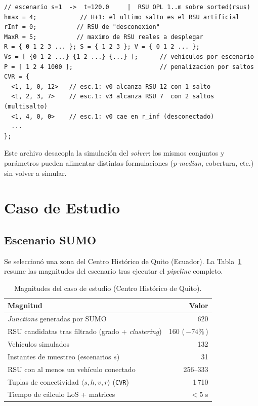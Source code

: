 \documentclass[smartcities,article,submit,oneauthor]{Definitions/mdpi}
\begin{document}
\begin{lstlisting}[language=opldat,caption={Extracto del conjunto de datos exportado
(\texttt{rsu\_backend.dat}) en sintaxis OPL, con cabecera de trazabilidad
escenario$\to t$ y RSU$\to$id de \emph{backend}.},label={lst:dat}]
// escenario s=1  ->  t=120.0     |  RSU OPL 1..m sobre sorted(rsus)
hmax = 4;            // H+1: el ultimo salto es el RSU artificial
rInf = 0;           // RSU de "desconexion"
MaxR = 5;           // maximo de RSU reales a desplegar
R = { 0 1 2 3 ... }; S = { 1 2 3 }; V = { 0 1 2 ... };
Vs = [ {0 1 2 ...} {1 2 ...} {...} ];      // vehiculos por escenario
P = [ 1 2 4 1000 ];                        // penalizacion por saltos
CVR = {
  <1, 1, 0, 12>   // esc.1: v0 alcanza RSU 12 con 1 salto
  <1, 2, 3, 7>    // esc.1: v3 alcanza RSU 7  con 2 saltos (multisalto)
  <1, 4, 0, 0>    // esc.1: v0 cae en r_inf (desconectado)
  ...
};
\end{lstlisting}

Este archivo desacopla la simulación del \emph{solver}: los mismos conjuntos y
parámetros pueden alimentar distintas formulaciones (\emph{p-median}, cobertura,
etc.) sin volver a simular.

\section{Caso de Estudio}\label{sec:caso}

\subsection{Escenario SUMO}
Se seleccionó una zona del Centro Histórico de Quito (Ecuador). La
Tabla~\ref{tab:caso} resume las magnitudes del escenario tras ejecutar el
\emph{pipeline} completo.

\begin{table}[H]
\caption{Magnitudes del caso de estudio (Centro Histórico de Quito).\label{tab:caso}}
\begin{tabularx}{\textwidth}{Xr}
\toprule
\textbf{Magnitud} & \textbf{Valor}\\
\midrule
\emph{Junctions} generadas por SUMO & 620\\
RSU candidatas tras filtrado (grado + \emph{clustering}) & 160 (\,$-74\%$\,)\\
Vehículos simulados & 132\\
Instantes de muestreo (escenarios $s$) & 31\\
RSU con al menos un vehículo conectado & 256--333\\
Tuplas de conectividad $\langle s,h,v,r\rangle$ (\texttt{CVR}) & 1\,710\\
Tiempo de cálculo LoS + matrices & $<5$ s\\
\bottomrule
\end{tabularx}
\end{table}
\end{document}
